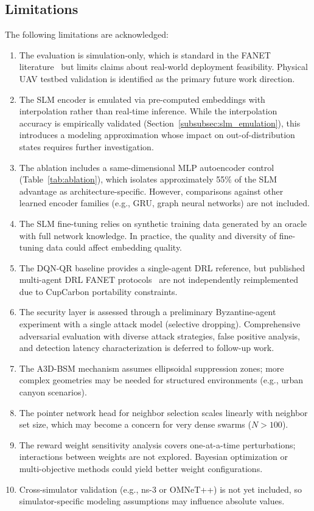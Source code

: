 \documentclass[5p,times]{elsarticle}
\begin{document}
\subsection{Limitations}

The following limitations are acknowledged:

\begin{enumerate}
\item The evaluation is simulation-only, which is standard in the FANET literature~\cite{bekmezci2013fanets,khan2020routing} but limits claims about real-world deployment feasibility. Physical UAV testbed validation is identified as the primary future work direction.
\item The SLM encoder is emulated via pre-computed embeddings with interpolation rather than real-time inference. While the interpolation accuracy is empirically validated (Section~\ref{subsubsec:slm_emulation}), this introduces a modeling approximation whose impact on out-of-distribution states requires further investigation.
\item The ablation includes a same-dimensional MLP autoencoder control (Table~\ref{tab:ablation}), which isolates approximately 55\% of the SLM advantage as architecture-specific. However, comparisons against other learned encoder families (e.g., GRU, graph neural networks) are not included.
\item The SLM fine-tuning relies on synthetic training data generated by an oracle with full network knowledge. In practice, the quality and diversity of fine-tuning data could affect embedding quality.
\item The DQN-QR baseline provides a single-agent DRL reference, but published multi-agent DRL FANET protocols~\cite{zhao2024marl_uav} are not independently reimplemented due to CupCarbon portability constraints.
\item The security layer is assessed through a preliminary Byzantine-agent experiment with a single attack model (selective dropping). Comprehensive adversarial evaluation with diverse attack strategies, false positive analysis, and detection latency characterization is deferred to follow-up work.
\item The A3D-BSM mechanism assumes ellipsoidal suppression zones; more complex geometries may be needed for structured environments (e.g., urban canyon scenarios).
\item The pointer network head for neighbor selection scales linearly with neighbor set size, which may become a concern for very dense swarms ($N > 100$).
\item The reward weight sensitivity analysis covers one-at-a-time perturbations; interactions between weights are not explored. Bayesian optimization or multi-objective methods could yield better weight configurations.
\item Cross-simulator validation (e.g., ns-3 or OMNeT++) is not yet included, so simulator-specific modeling assumptions may influence absolute values.
\end{enumerate}
\end{document}
